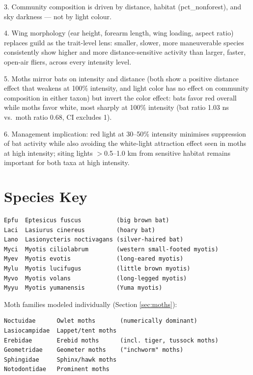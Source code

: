 \documentclass[11pt, letterpaper]{article}
\begin{document}
3. Community composition is driven by distance, habitat (pct\_nonforest),
   and sky darkness --- not by light colour.

4. Wing morphology (ear height, forearm length, wing loading, aspect
   ratio) replaces guild as the trait-level lens: smaller, slower,
   more maneuverable species consistently show higher and more
   distance-sensitive activity than larger, faster, open-air fliers,
   across every intensity level.

5. Moths mirror bats on intensity and distance (both show a positive
   distance effect that weakens at 100\% intensity, and light color
   has no effect on community composition in either taxon) but invert
   the color effect: bats favor red overall while moths favor white,
   most sharply at 100\% intensity (bat ratio 1.03 ns vs.\ moth ratio
   0.68, CI excludes 1).

6. Management implication: red light at 30--50\% intensity minimises
   suppression of bat activity while also avoiding the white-light
   attraction effect seen in moths at high intensity; siting lights
   $>$0.5--1.0 km from sensitive habitat remains important for both
   taxa at high intensity.

\section{Species Key}

\begin{verbatim}
Epfu  Eptesicus fuscus          (big brown bat)
Laci  Lasiurus cinereus         (hoary bat)
Lano  Lasionycteris noctivagans (silver-haired bat)
Myci  Myotis ciliolabrum        (western small-footed myotis)
Myev  Myotis evotis             (long-eared myotis)
Mylu  Myotis lucifugus          (little brown myotis)
Myvo  Myotis volans             (long-legged myotis)
Myyu  Myotis yumanensis         (Yuma myotis)
\end{verbatim}

Moth families modeled individually (Section \ref{sec:moths}):

\begin{verbatim}
Noctuidae      Owlet moths       (numerically dominant)
Lasiocampidae  Lappet/tent moths
Erebidae       Erebid moths      (incl. tiger, tussock moths)
Geometridae    Geometer moths    ("inchworm" moths)
Sphingidae     Sphinx/hawk moths
Notodontidae   Prominent moths
\end{verbatim}
\end{document}
